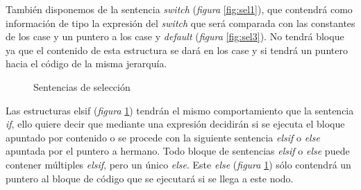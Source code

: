 \documentclass[a4paper,10pt]{article}
\begin{document}
También disponemos de la sentencia \textit{switch} (\emph{figura} \ref{fig:sel1}), que contendrá como información de tipo la expresión del \textit{switch} que será comparada con las constantes de los case y un puntero a los case y \textit{default} (\emph{figura} \ref{fig:sel3}). No tendrá bloque ya que el contenido de esta estructura se dará en los case y si tendrá un puntero hacia el código de la misma jerarquía.
\begin{figure}[H]
  \centering
  \hspace{11mm}
  \caption{Sentencias de selección}
  \label{fig:sel2}
\end{figure}

Las estructuras elsif (\emph{figura} \ref{fig:sel2}) tendrán el mismo comportamiento que la sentencia \textit{if}, ello quiere decir que mediante una expresión decidirán si se ejecuta el bloque apuntado por contenido o se procede con la siguiente sentencia \textit{elsif} o \textit{else} apuntada por el puntero a hermano. Todo bloque de sentencias \textit{elsif} o \textit{else} puede contener múltiples \textit{elsif}, pero un único \textit{else}. Este \textit{else} (\emph{figura} \ref{fig:sel2}) sólo contendrá un puntero al bloque de código que se ejecutará si se llega a este nodo.
\end{document}
